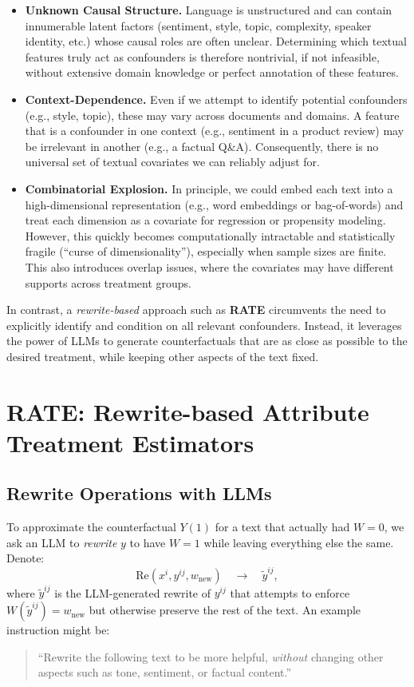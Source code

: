 \documentclass{article}
\theoremstyle{definition}
\begin{document}
\begin{itemize}
    \item \textbf{Unknown Causal Structure.} Language is unstructured and can contain innumerable latent factors (sentiment, style, topic, complexity, speaker identity, etc.) whose causal roles are often unclear. Determining which textual features truly act as confounders is therefore nontrivial, if not infeasible, without extensive domain knowledge or perfect annotation of these features.

    \item \textbf{Context-Dependence.} Even if we attempt to identify potential confounders (e.g., style, topic), these may vary across documents and domains. A feature that is a confounder in one context (e.g., sentiment in a product review) may be irrelevant in another (e.g., a factual Q\&A). Consequently, there is no universal set of textual covariates we can reliably adjust for.

    \item \textbf{Combinatorial Explosion.} In principle, we could embed each text into a high-dimensional representation (e.g., word embeddings or bag-of-words) and treat each dimension as a covariate for regression or propensity modeling. However, this quickly becomes computationally intractable and statistically fragile (``curse of dimensionality''), especially when sample sizes are finite. This also introduces overlap issues, where the covariates may have different supports across treatment groups.

\end{itemize}

In contrast, a \emph{rewrite-based} approach such as \textbf{RATE} circumvents the need to explicitly identify and condition on all relevant confounders. Instead, it leverages the power of LLMs to generate counterfactuals that are as close as possible to the desired treatment, while keeping other aspects of the text fixed.

\section{RATE: Rewrite-based Attribute Treatment Estimators}
\label{sec:rate}

\subsection{Rewrite Operations with LLMs}
To approximate the counterfactual $Y(1)$ for a text that actually had $W=0$, we ask an LLM to \emph{rewrite} $y$ to have $W=1$ while leaving everything else the same. Denote:
\[
\text{Re}(x^i, y^{ij}, w_{\text{new}}) \quad\longrightarrow\quad \tilde{y}^{ij},
\]
where $\tilde{y}^{ij}$ is the LLM-generated rewrite of $y^{ij}$ that attempts to enforce $W(\tilde{y}^{ij}) = w_{\text{new}}$ but otherwise preserve the rest of the text. An example instruction might be:  
\begin{quote}
``Rewrite the following text to be more helpful, \textit{without} changing other aspects such as tone, sentiment, or factual content.''  
\end{quote}
\end{document}
